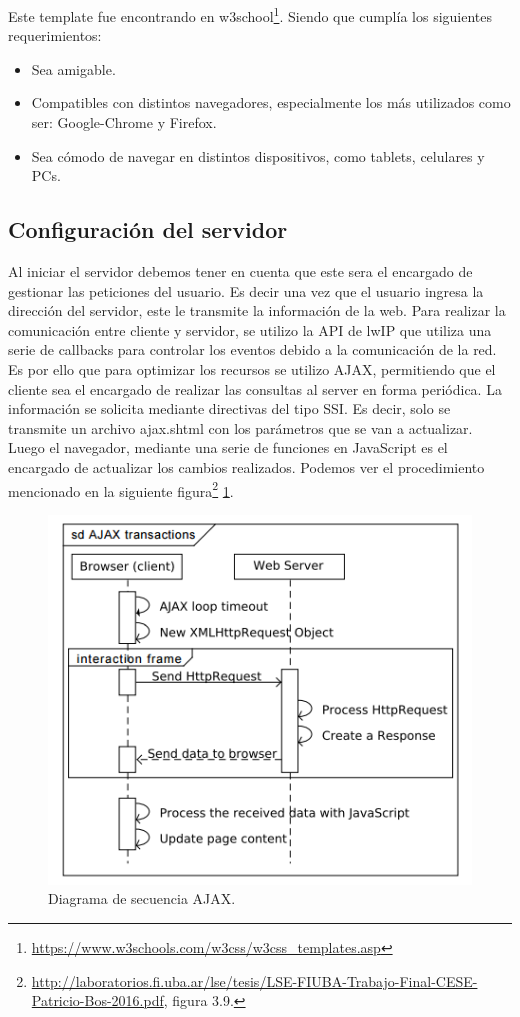 Este template fue encontrando en w3school\footnote{\url{https://www.w3schools.com/w3css/w3css_templates.asp}}. Siendo que cumplía los siguientes requerimientos:
\begin{itemize}
  \item Sea amigable.
  \item Compatibles con distintos navegadores, especialmente los más utilizados como ser: Google-Chrome y Firefox. 
  \item Sea cómodo de navegar en distintos dispositivos, como tablets, celulares y PCs.
\end{itemize}


\subsection*{Configuración del servidor}
Al iniciar el servidor debemos tener en cuenta que este sera el encargado de gestionar las peticiones del usuario. Es decir una vez que el usuario ingresa la dirección del servidor, este le transmite la información de la web.  Para realizar la comunicación entre cliente y servidor, se utilizo la API de lwIP  que utiliza una serie de callbacks para controlar los eventos debido a la comunicación de la red. Es por ello que para optimizar los recursos se utilizo AJAX, permitiendo que el cliente sea el encargado de realizar las consultas al server en forma periódica. La información se solicita mediante directivas del tipo SSI.
Es decir, solo se transmite un archivo ajax.shtml con los parámetros que se van a actualizar. Luego el navegador, mediante una serie de funciones en JavaScript es el encargado de actualizar los cambios realizados.  
Podemos ver el procedimiento mencionado en la siguiente figura\footnote{\url{http://laboratorios.fi.uba.ar/lse/tesis/LSE-FIUBA-Trabajo-Final-CESE-Patricio-Bos-2016.pdf}, figura 3.9.} \ref{fig:ajax_sec}.
\begin{figure}[!htb]
  \centering
  \includegraphics[scale=.8]{./Figures/ajax_sec.png}
  \caption{Diagrama de secuencia AJAX.}
  \label{fig:ajax_sec}
\end{figure}


